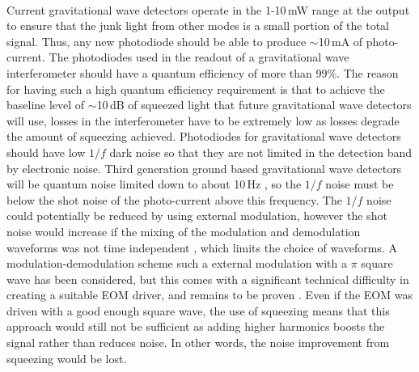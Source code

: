\paragraph{}
Current gravitational wave detectors operate in the 1-10\,mW range at the output \cite{Prijatelj2012} to ensure that the junk light from other modes is a small portion of the total signal. Thus, any new photodiode should be able to produce $\sim$10\,mA of photo-current. The photodiodes used in the readout of a gravitational wave interferometer should have a quantum efficiency of more than 99\%. The reason for having such a high quantum efficiency requirement is that to achieve the baseline level of $\sim$10\,dB of squeezed light that future gravitational wave detectors will use, losses in the interferometer have to be extremely low as losses degrade the amount of squeezing achieved. Photodiodes for gravitational wave detectors should have low $1/f$ dark noise so that they are not limited in the detection band by electronic noise. Third generation ground based gravitational wave detectors will be quantum noise limited down to about 10\,Hz \cite{Harry2010}, so the $1/f$ noise must be below the shot noise of the photo-current above this frequency. The $1/f$ noise could potentially be reduced by using external modulation, however the shot noise would increase if the mixing of the modulation and demodulation waveforms was not time independent \cite{Meers1991}, which limits the choice of waveforms. A modulation-demodulation scheme such a external modulation with a $\pi$ square wave has been considered, but this comes with a significant technical difficulty in creating a suitable EOM driver, and remains to be proven \cite{Meers1991}. Even if the EOM was driven with a good enough square wave, the use of squeezing means that this approach would still not be sufficient as adding higher harmonics boosts the signal rather than reduces noise. In other words, the noise improvement from squeezing would be lost.
